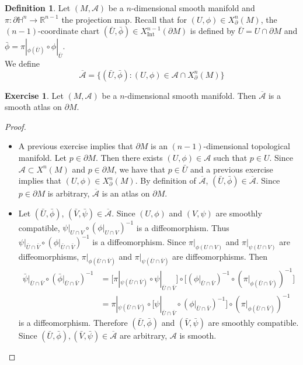 \documentclass{book}
\theoremstyle{definition}
\newtheorem{defn}[definition]{Definition}
\newtheorem{ex}[definition]{Exercise}
\renewcommand{\H}{\mathbb{H}}
\newcommand{\R}{\mathbb{R}}
\newcommand{\MA}{\mathcal{A}}
\DeclareMathOperator{\Int}{Int}
\DeclareMathOperator*{\0}{\mbf{0}}
\DeclareMathOperator*{\1}{\mbf{1}}
\newcommand{\ol}[1]{\overline{#1}}
\newcommand{\p}{\partial}
\begin{document}
	\begin{defn} 
		Let $(M, \MA)$ be a $n$-dimensional smooth manifold and $\pi: \p \H^n \rightarrow \R^{n-1}$ the projection map. Recall that for $(U, \phi) \in X^n_{\p}(M)$, the $(n-1)$-coordinate chart $(\bar{U}, \bar{\phi}) \in X^{n-1}_{\Int}(\p M)$ is defined by $\bar{U} = U \cap \p M$ and $\bar{\phi} = \pi|_{\phi(\bar{U})} \circ \phi|_{\bar{U}}$. \\
		We define 
		$$\ol{\MA} = \{(\bar{U}, \bar{\phi}): (U, \phi) \in \MA \cap X^n_{\p}(M) \}$$
	\end{defn}
	
	\begin{ex}
		Let $(M, \MA)$ be a $n$-dimensional smooth manifold. Then $\ol{\MA}$ is a smooth atlas on $\p M$.
	\end{ex}
	
	\begin{proof}\
		\begin{itemize}
			\item A previous exercise implies that $\p M$ is an $(n-1)$-dimensional topological manifold. Let $p \in \partial M$. Then there exists $(U, \phi) \in \MA$ such that $p \in U$. Since $\MA \subset X^n(M)$ and $p \in \p M$, we have that $p \in \bar{U}$ and a previous exercise implies that $(U, \phi) \in X^n_{\p}(M)$. By definition of $\ol{\MA}$, $(\bar{U}, \bar{\phi}) \in \ol{\MA}$. Since $p \in \p M$ is arbitrary, $\ol{\MA}$ is an atlas on $\p M$. 
			
			
			\item Let $(\bar{U}, \bar{\phi})$, $(\bar{V}, \bar{\psi}) \in \ol{\MA}$. Since $(U, \phi)$ and $(V, \psi)$ are smoothly compatible, $\psi|_{U \cap V} \circ (\phi|_{U \cap V})^{-1}$ is a diffeomorphism. Thus $\psi|_{\bar{U} \cap \bar{V}} \circ (\phi|_{\bar{U} \cap \bar{V}})^{-1}$ is a diffeomorphism. Since $\pi|_{\phi(U \cap V)}$ and $\pi|_{\psi(U \cap V)}$ are diffeomorphisms, $\pi|_{\phi(\bar{U} \cap \bar{V})}$ and $\pi|_{\psi(\bar{U} \cap \bar{V})}$ are diffeomorphisms. Then 
			\begin{align*}
				\bar{\psi}|_{\bar{U} \cap \bar{V}} \circ (\bar{\phi}|_{\bar{U} \cap \bar{V}})^{-1}
				& = \bigg[ \pi|_{\psi(\bar{U} \cap \bar{V})} \circ \psi|_{\bar{U} \cap \bar{V}} \bigg] \circ \bigg[ (\phi|_{\bar{U} \cap \bar{V}})^{-1} \circ( \pi|_{\phi(\bar{U} \cap \bar{V})})^{-1} \bigg] \\
				& =\pi|_{\psi(\bar{U} \cap \bar{V})} \circ \bigg[ \psi|_{\bar{U} \cap \bar{V}} \circ (\phi|_{\bar{U} \cap \bar{V}})^{-1} \bigg] \circ (\pi|_{\phi(\bar{U} \cap \bar{V})})^{-1}
			\end{align*}
			is a diffeomorphism. Therefore $(\bar{U}, \bar{\phi})$ and $(\bar{V}, \bar{\psi})$ are smoothly compatible. Since $(\bar{U}, \bar{\phi}), (\bar{V}, \bar{\psi}) \in \ol{\MA}$ are arbitrary, $\MA$ is smooth.
		\end{itemize}
	\end{proof}
\end{document}
